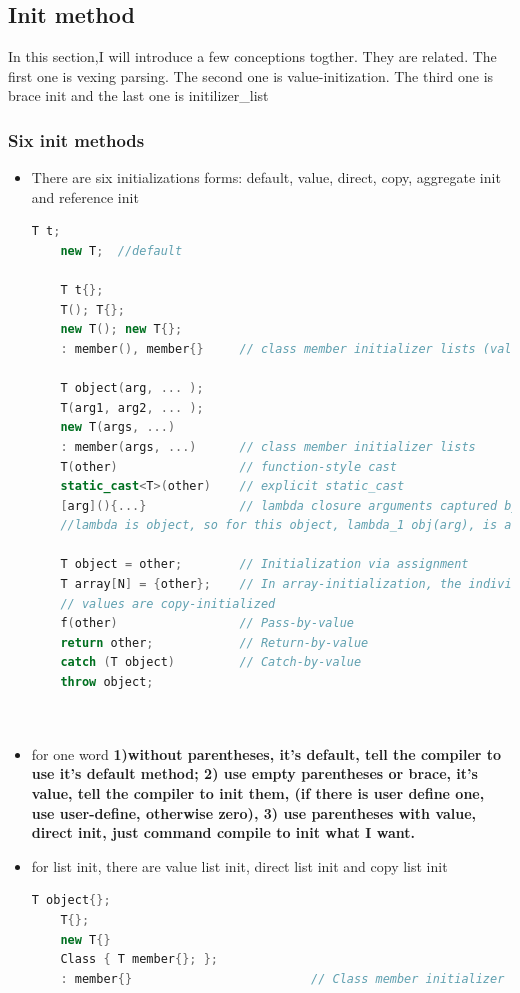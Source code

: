 \documentclass[a4paper,12pt,twoside]{book}
\begin{document}
\subsection{Init method}
In this section,I will introduce a few conceptions togther. They are related. The first one is vexing parsing. The second one is value-initization. The third one is brace init and the last one is initilizer\_list
\subsubsection{Six init methods}
\begin{itemize}
	\item There are six initializations forms: default, value, direct, copy, aggregate init and reference init
	\begin{lstlisting}[frame=single, language=c++]
	T t;
	new T;  //default
	
	T t{};
	T(); T{};
	new T(); new T{};
	: member(), member{}     // class member initializer lists (value Init)
	
	T object(arg, ... );
	T(arg1, arg2, ... );
	new T(args, ...)
	: member(args, ...)      // class member initializer lists
	T(other)                 // function-style cast
	static_cast<T>(other)    // explicit static_cast
	[arg](){...}             // lambda closure arguments captured by value
	//lambda is object, so for this object, lambda_1 obj(arg), is a direct init
	
	T object = other;        // Initialization via assignment
	T array[N] = {other};    // In array-initialization, the individual
	// values are copy-initialized
	f(other)                 // Pass-by-value
	return other;            // Return-by-value
	catch (T object)         // Catch-by-value
	throw object;
	
	
	\end{lstlisting}
	\item for one word \textbf{1)without parentheses, it's default, tell the compiler to use it's default method; 2) use empty parentheses or brace, it's value, tell the compiler to init them, (if there is user define one, use user-define, otherwise zero), 3) use parentheses with value, direct init, just command compile to init what I want.}
	
	
	\item for list init, there are value list init, direct list init and copy list init
	\begin{lstlisting}[frame=single, language=c++]
	T object{};
	T{};
	new T{}
	Class { T member{}; };
	: member{}                         // Class member initializer lists
	

\end{lstlisting}
\end{itemize}
\end{document}
